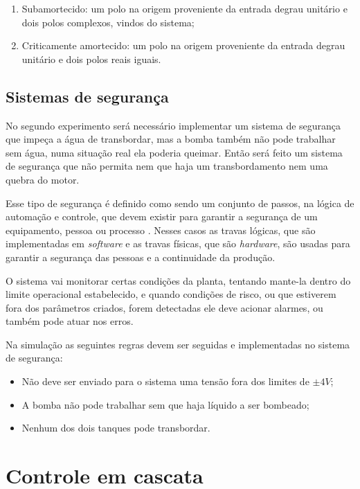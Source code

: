 \documentclass[
	12pt,				%
	openany,			%
	oneside,			%
	a4paper,			%
	english,			%
	french,				%
	spanish,			%
	brazil,				%
	]{abntex2}
\begin{document}
{\begin{enumerate}
	\item Subamortecido: um polo na origem proveniente da entrada degrau unitário e dois polos complexos, vindos do sistema;
	
	\item Criticamente amortecido: um polo na origem proveniente da entrada degrau unitário e dois polos reais iguais.		
\end{enumerate}

\subsection{Sistemas de segurança}

No segundo experimento será necessário implementar um sistema de segurança que impeça a água de transbordar, mas a bomba também não pode trabalhar sem água, numa situação real ela poderia queimar. Então será feito um sistema de segurança que não permita nem que haja um transbordamento nem uma quebra do motor. 

Esse tipo de segurança é definido como sendo um conjunto de passos, na lógica de automação e controle, que devem existir para garantir a segurança de um equipamento, pessoa ou processo \cite{meneghetti1}. Nesses casos as travas lógicas, que são implementadas em \textit{software} e as travas físicas, que são \textit{hardware}, são usadas para garantir a segurança das pessoas e a continuidade da produção.

O sistema vai monitorar certas condições da planta, tentando mante-la dentro do limite operacional estabelecido, e quando condições de risco, ou que estiverem fora dos parâmetros criados, forem detectadas ele deve acionar alarmes, ou também pode atuar nos erros.

Na simulação as seguintes regras devem ser seguidas e implementadas no sistema de segurança:

\begin{itemize}
	\item Não deve ser enviado para o sistema uma tensão fora dos limites de $\pm 4V$;
	\item A bomba não pode trabalhar sem que haja líquido a ser bombeado;
	\item Nenhum dos dois tanques pode transbordar.
\end{itemize}

\section{Controle em cascata}

}
\end{document}
